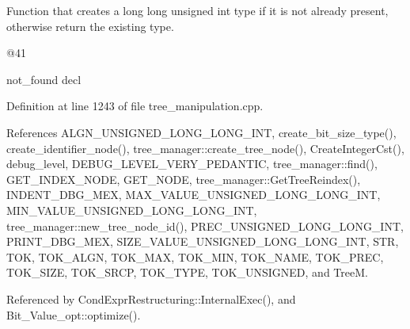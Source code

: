 Function that creates a long long unsigned int type if it is not already present, otherwise return the existing type. 

@41

not\+\_\+found decl 

Definition at line 1243 of file tree\+\_\+manipulation.\+cpp.



References A\+L\+G\+N\+\_\+\+U\+N\+S\+I\+G\+N\+E\+D\+\_\+\+L\+O\+N\+G\+\_\+\+L\+O\+N\+G\+\_\+\+I\+NT, create\+\_\+bit\+\_\+size\+\_\+type(), create\+\_\+identifier\+\_\+node(), tree\+\_\+manager\+::create\+\_\+tree\+\_\+node(), Create\+Integer\+Cst(), debug\+\_\+level, D\+E\+B\+U\+G\+\_\+\+L\+E\+V\+E\+L\+\_\+\+V\+E\+R\+Y\+\_\+\+P\+E\+D\+A\+N\+T\+IC, tree\+\_\+manager\+::find(), G\+E\+T\+\_\+\+I\+N\+D\+E\+X\+\_\+\+N\+O\+DE, G\+E\+T\+\_\+\+N\+O\+DE, tree\+\_\+manager\+::\+Get\+Tree\+Reindex(), I\+N\+D\+E\+N\+T\+\_\+\+D\+B\+G\+\_\+\+M\+EX, M\+A\+X\+\_\+\+V\+A\+L\+U\+E\+\_\+\+U\+N\+S\+I\+G\+N\+E\+D\+\_\+\+L\+O\+N\+G\+\_\+\+L\+O\+N\+G\+\_\+\+I\+NT, M\+I\+N\+\_\+\+V\+A\+L\+U\+E\+\_\+\+U\+N\+S\+I\+G\+N\+E\+D\+\_\+\+L\+O\+N\+G\+\_\+\+L\+O\+N\+G\+\_\+\+I\+NT, tree\+\_\+manager\+::new\+\_\+tree\+\_\+node\+\_\+id(), P\+R\+E\+C\+\_\+\+U\+N\+S\+I\+G\+N\+E\+D\+\_\+\+L\+O\+N\+G\+\_\+\+L\+O\+N\+G\+\_\+\+I\+NT, P\+R\+I\+N\+T\+\_\+\+D\+B\+G\+\_\+\+M\+EX, S\+I\+Z\+E\+\_\+\+V\+A\+L\+U\+E\+\_\+\+U\+N\+S\+I\+G\+N\+E\+D\+\_\+\+L\+O\+N\+G\+\_\+\+L\+O\+N\+G\+\_\+\+I\+NT, S\+TR, T\+OK, T\+O\+K\+\_\+\+A\+L\+GN, T\+O\+K\+\_\+\+M\+AX, T\+O\+K\+\_\+\+M\+IN, T\+O\+K\+\_\+\+N\+A\+ME, T\+O\+K\+\_\+\+P\+R\+EC, T\+O\+K\+\_\+\+S\+I\+ZE, T\+O\+K\+\_\+\+S\+R\+CP, T\+O\+K\+\_\+\+T\+Y\+PE, T\+O\+K\+\_\+\+U\+N\+S\+I\+G\+N\+ED, and TreeM.



Referenced by Cond\+Expr\+Restructuring\+::\+Internal\+Exec(), and Bit\+\_\+\+Value\+\_\+opt\+::optimize().

